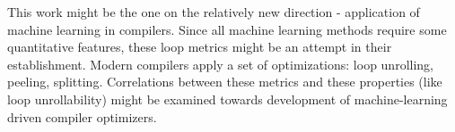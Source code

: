 \null\qquad This work might be the one on the relatively new direction - application of machine learning in compilers. Since all machine learning methods require some quantitative features, these loop metrics might be an attempt in their establishment. Modern compilers apply a set of optimizations: loop unrolling, peeling, splitting. Correlations between these metrics and these properties (like loop unrollability) might be examined towards development of machine-learning driven compiler optimizers.      